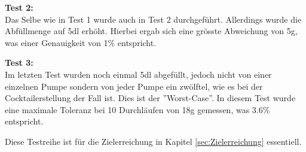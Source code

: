 \textbf{Test 2:} \\
Das Selbe wie in Test 1 wurde auch in Test 2 durchgeführt. Allerdings wurde die Abfüllmenge auf 5dl erhöht. Hierbei ergab sich eine grösste Abweichung von 5g, was einer Genauigkeit von 1\% entspricht.

\textbf{Test 3:} \\
Im letzten Test wurden noch einmal 5dl abgefüllt, jedoch nicht von einer einzelnen Pumpe sondern von jeder Pumpe ein zwölftel, wie es bei der Cocktailerstellung der Fall ist. Dies ist der ''Worst-Case''. In diesem Test wurde eine maximale Toleranz bei 10 Durchläufen von 18g gemessen, was 3.6\% entspricht.

Diese Testreihe ist für die Zielerreichung in Kapitel \ref{sec:Zielerreichung} essentiell.